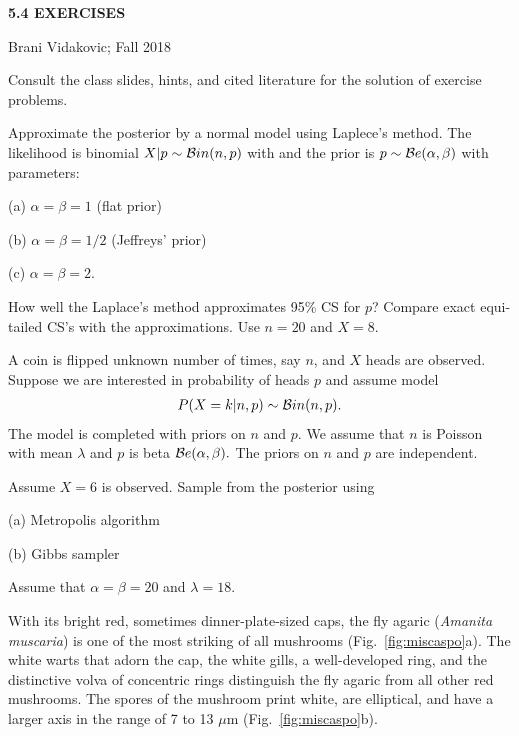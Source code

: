 \documentclass[12pt]{article}
\newcommand{\ba}{\begin{eqnarray*}}
\newcommand{\ea}{\end{eqnarray*}}
\newcommand{\twof}[4]
{
\hbox to\hsize{\hss
    \vbox{\psfig{figure=#1,width=#3,height=#4}}\qquad
    \vbox{\psfig{figure=#2,width=#3,height=#4}}
    \hss}
}
\begin{document}
\thispagestyle{empty}
\vspace*{0.1in}

\begin{center}
        { \Large \bf   5.4 EXERCISES}
\end{center}

\noindent  Brani  Vidakovic;  Fall 2018


\noindent Consult the class slides, hints, and  cited literature for
the solution of exercise problems.



\vspace{0.5in}

Approximate the posterior by a normal model using Laplece's method.
The likelihood is binomial $X|p \sim {\cal B}in(n, p)$ with and the prior
is $p \sim {\cal B}e(\alpha, \beta) $ with parameters:

(a) $\alpha=\beta =1$ (flat prior)

(b) $\alpha = \beta = 1/2 $ (Jeffreys' prior)

(c) $\alpha = \beta = 2.$

How well the Laplace's method approximates 95\% CS for $p$?
Compare exact equi-tailed CS's with the approximations. Use $n=20$
and $X = 8.$


\vspace{0.3in}

 A coin is flipped unknown number of times, say $n$,
and $X$  heads are observed. Suppose we are interested in
probability of heads $p$ and assume
model
\ba
P(X=k|n, p) \sim {\cal B}in(n, p).
\ea
The model is completed with priors on $n$ and $p$.
We assume that $n$ is Poisson with mean $\lambda$
and $p$ is beta ${\cal B}e(\alpha, \beta).$ The priors on $n$ and
$p$ are independent.

Assume $X=6$ is observed. Sample from the posterior
using

(a) Metropolis algorithm

(b) Gibbs sampler

Assume that $\alpha = \beta= 20$ and $\lambda = 18.$

\vspace*{0.2in}

With its bright red, sometimes dinner-plate-sized caps,
the fly agaric ({\it Amanita muscaria})
is one of the most striking of all mushrooms (Fig.~\ref{fig:miscaspo}a).
The white warts that adorn the cap, the white gills, a well-developed ring,
and the distinctive volva of concentric rings distinguish the
fly agaric from all other red mushrooms. The spores
 of the mushroom print white,
 are elliptical, and have  a larger axis in the range of 7 to 13 $\mu$m (Fig.~\ref{fig:miscaspo}b).
%
\end{document}
